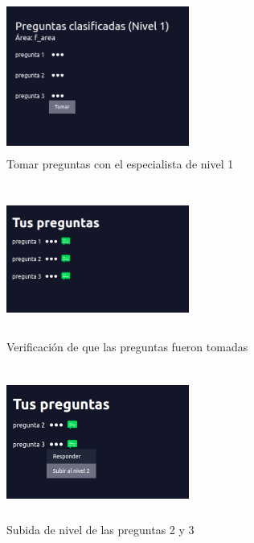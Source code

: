 \begin{figure}[h]
	\begin{center}
		\includegraphics[width=6cm, height=5cm]{tomar_preguntas.png}
		\caption{Tomar preguntas con el especialista de nivel 1}
		\label{fig:f_tomar_preguntas1}
		
	\end{center}
\end{figure}

\begin{figure}[h]
	\begin{center}
		\includegraphics[width=6cm, height=5cm]{verificar_preguntas_tomadas.png}
		\caption{Verificación de que las preguntas fueron tomadas}
		\label{fig:f_virificar_preguntas_tomadas1}
		
	\end{center}
\end{figure}

\begin{figure}[h]
	\begin{center}
		\includegraphics[width=6cm, height=5cm]{subir_nivel_2.png}
		\caption{Subida de nivel de las preguntas 2 y 3}
		\label{fig:f_subir_nivel_2}
		
	\end{center}
\end{figure}

